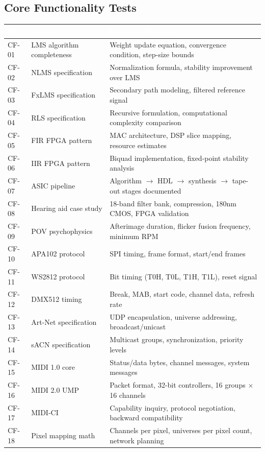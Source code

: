 \documentclass[11pt,letterpaper]{article}
\newcommand{\tableheader}[1]{\textbf{\sffamily\textcolor{white}{#1}}}
\begin{document}
\subsection{Core Functionality Tests}

\begin{center}
\begin{tabularx}{\textwidth}{C{1.2cm}L{3.5cm}X}
\toprule
{}
\tableheader{ID} & \tableheader{Verifies} & \tableheader{Expected Behavior} \\
\midrule
CF-01 & LMS algorithm completeness & Weight update equation, convergence condition, step-size bounds \\
CF-02 & NLMS specification & Normalization formula, stability improvement over LMS \\
CF-03 & FxLMS specification & Secondary path modeling, filtered reference signal \\
CF-04 & RLS specification & Recursive formulation, computational complexity comparison \\
CF-05 & FIR FPGA pattern & MAC architecture, DSP slice mapping, resource estimates \\
CF-06 & IIR FPGA pattern & Biquad implementation, fixed-point stability analysis \\
CF-07 & ASIC pipeline & Algorithm $\to$ HDL $\to$ synthesis $\to$ tape-out stages documented \\
CF-08 & Hearing aid case study & 18-band filter bank, compression, 180nm CMOS, FPGA validation \\
CF-09 & POV psychophysics & Afterimage duration, flicker fusion frequency, minimum RPM \\
CF-10 & APA102 protocol & SPI timing, frame format, start/end frames \\
CF-11 & WS2812 protocol & Bit timing (T0H, T0L, T1H, T1L), reset signal \\
CF-12 & DMX512 timing & Break, MAB, start code, channel data, refresh rate \\
CF-13 & Art-Net specification & UDP encapsulation, universe addressing, broadcast/unicast \\
CF-14 & sACN specification & Multicast groups, synchronization, priority levels \\
CF-15 & MIDI 1.0 core & Status/data bytes, channel messages, system messages \\
CF-16 & MIDI 2.0 UMP & Packet format, 32-bit controllers, 16 groups $\times$ 16 channels \\
CF-17 & MIDI-CI & Capability inquiry, protocol negotiation, backward compatibility \\
CF-18 & Pixel mapping math & Channels per pixel, universes per pixel count, network planning \\
\bottomrule
\end{tabularx}
\end{center}
\end{document}
